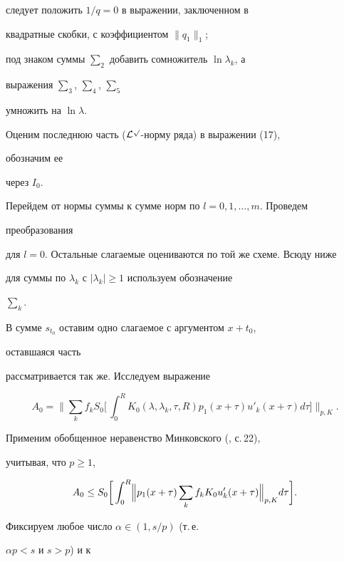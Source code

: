 {\begin{lem}
следует положить $1/q=0$ в выражении, заключенном в


квадратные скобки, с коэффициентом $\|q_1\|_1$;


под знаком суммы $\sum_2$ добавить сомножитель $\ln\lambda_k$, а


выражения $\sum_3$, $\sum_4$, $\sum_5$


умножить на $\ln\lambda$.


\end{lem}





Оценим последнюю часть ($\cal L^p$-норму ряда) в выражении (17),


обозначим ее


через $I_0$.


Перейдем от нормы суммы к сумме норм по $l=0,1,\dotsc,m$. Проведем


преобразования


для $l=0$. Остальные слагаемые оцениваются по той же схеме. Всюду ниже


для суммы по $\lambda_k$ с $|\lambda_k|\ge 1$ используем обозначение


$\sum\limits_k$.





В сумме $s_{t_0}$ оставим одно слагаемое с аргументом $x+t_0$,


оставшаяся часть


рассматривается так же. Исследуем выражение


$$


A_0=\biggl\|\sum_k f_k S_0\biggl[\,\int^R_0


K_0(\lambda,\lambda_k,\tau,R)p_1(x+\tau)u'_k(x+\tau)d\tau


\biggr]\biggr\|_{p,K}.


$$


Применим обобщенное неравенство Минковского (\cite{8}, с.\,22),


учитывая, что $p\ge 1$,


\begin{equation}


A_0\le S_0\biggl[\,\int^R_0\Bigl\|p_1(x+\tau)\sum_k f_k K_0 u'_k


(x+\tau)\Bigr\|_{p,K}d\tau\biggr].


\end{equation}


Фиксируем любое число $\alpha\in(1,s/p)$ (т.\,е.


$\alpha p<s$ и $s>p$) и к


}
